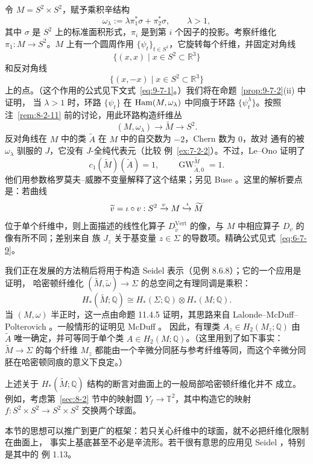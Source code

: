 \begin{example}\label{ex:8-4-3}
令 $M=S^2\times S^2$，赋予乘积辛结构
\[
  \omega_\lambda:=\lambda\pi_1^*\sigma+\pi_2^*\sigma,
  \qquad\lambda>1,
\]
其中 $\sigma$ 是 $S^2$ 上的标准面积形式，$\pi_i$ 是到第 $i$ 个因子的投影。考察纤维化
$\pi_1:M\to S^2$。$M$ 上有一个圆周作用
$\{\psi_t\}_{t\in S^1}$，它旋转每个纤维，并固定对角线
\[
  \{(x,x)\mid x\in S^2\subset\mathbb R^3\}
\]
和反对角线
\[
  \{(x,-x)\mid x\in S^2\subset\mathbb R^3\}
\]
上的点。（这个作用的公式见下文式~\eqref{eq:9-7-1}。）我们将在命题~\ref{prop:9-7-2}\textup{(ii)} 中证明，
当 $\lambda>1$ 时，环路 $\{\psi_t\}$ 在
$\operatorname{Ham}(M,\omega_\lambda)$ 中同痕于环路 $\{\psi_t^\lambda\}$。按照
注~\ref{rem:8-2-11} 前的讨论，用此环路构造纤维丛
\[
  (M,\omega_\lambda)\longrightarrow\widetilde M\longrightarrow S^2.
\]
反对角线在 $M$ 中的类 $\widetilde A$ 在 $M$ 中的自交数为 $-2$，Chern 数为 $0$，故对
通有的被 $\omega_\lambda$ 驯服的 $J$，它没有 $J$-全纯代表元（比较
例~\ref{ex:7-2-2}）。不过，Le--Ono  证明了
\[
  c_1(\widetilde M)(\widetilde A)=1,
  \qquad
  \operatorname{GW}^{\widetilde M}_{\widetilde A,0}=1.
\]
他们用参数格罗莫夫--威滕不变量解释了这个结果；另见 Buse 。这里的解析要点
是：若曲线
\[
  \widetilde v=\iota\circ v:
  S^2\xrightarrow{v}M\xhookrightarrow{\iota}\widetilde M
\]
位于单个纤维中，则上面描述的线性化算子
$D_{\widetilde v}^{\mathrm{Vert}}$ 的像，与 $M$ 中相应算子 $D_v$ 的像有所不同；差别来自
族 $J_z$ 关于基变量 $z\in\Sigma$ 的导数项。精确公式见式~\eqref{eq:6-7-9}。
\end{example}

\begin{remark}\label{rem:8-4-4}
我们正在发展的方法稍后将用于构造 Seidel 表示（见例 8.6.8）；它的一个应用是证明，
哈密顿纤维化 $(\widetilde M,\widetilde\omega)\to\Sigma$ 的总空间之有理同调是乘积：
\[
  H_*(\widetilde M;\mathbb Q)
  \cong H_*(\Sigma;\mathbb Q)\otimes H_*(M;\mathbb Q).
\]
当 $(M,\omega)$ 半正时，这一点由命题 11.4.5 证明，其思路来自
Lalonde--McDuff--Polterovich 。一般情形的证明见 McDuff 。
因此，有理类 $A_z\in H_2(M_z;\mathbb Q)$ 由 $\widetilde A$ 唯一确定，并可等同于单个类
$A\in H_2(M;\mathbb Q)$。（这里用到了如下事实：$\widetilde M\to\Sigma$ 的每个纤维
$M_z$ 都能由一个辛微分同胚与参考纤维等同，而这个辛微分同胚在哈密顿同痕的意义下良定。）

上述关于 $H_*(\widetilde M;\mathbb Q)$ 结构的断言对曲面上的一般局部哈密顿纤维化并不
成立。例如，考虑第~\ref{sec:8-2} 节中的映射圆 $Y_f\to\mathbb T^2$，其中构造它的映射
$f:S^2\times S^2\to S^2\times S^2$ 交换两个球面。

本节的思想可以推广到更广的框架：若只关心纤维中的球面，就不必把纤维化限制在曲面上，
事实上基底甚至不必是辛流形。若干很有意思的应用见 Seidel ，特别是其中的
例 1.13。
\end{remark}
